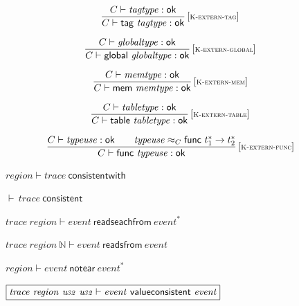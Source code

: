 $$
\begin{array}{@{}c@{}}\displaystyle
\frac{
C \vdash {\mathit{tagtype}} : \mathsf{ok}
}{
C \vdash \mathsf{tag}~{\mathit{tagtype}} : \mathsf{ok}
} \, {[\textsc{\scriptsize K{-}extern{-}tag}]}
\qquad
\end{array}
$$

$$
\begin{array}{@{}c@{}}\displaystyle
\frac{
C \vdash {\mathit{globaltype}} : \mathsf{ok}
}{
C \vdash \mathsf{global}~{\mathit{globaltype}} : \mathsf{ok}
} \, {[\textsc{\scriptsize K{-}extern{-}global}]}
\qquad
\end{array}
$$

$$
\begin{array}{@{}c@{}}\displaystyle
\frac{
C \vdash {\mathit{memtype}} : \mathsf{ok}
}{
C \vdash \mathsf{mem}~{\mathit{memtype}} : \mathsf{ok}
} \, {[\textsc{\scriptsize K{-}extern{-}mem}]}
\qquad
\end{array}
$$

$$
\begin{array}{@{}c@{}}\displaystyle
\frac{
C \vdash {\mathit{tabletype}} : \mathsf{ok}
}{
C \vdash \mathsf{table}~{\mathit{tabletype}} : \mathsf{ok}
} \, {[\textsc{\scriptsize K{-}extern{-}table}]}
\qquad
\end{array}
$$

$$
\begin{array}{@{}c@{}}\displaystyle
\frac{
C \vdash {\mathit{typeuse}} : \mathsf{ok}
 \qquad
{\mathit{typeuse}} \approx_{C} \mathsf{func}~{t_1^\ast} \rightarrow {t_2^\ast}
}{
C \vdash \mathsf{func}~{\mathit{typeuse}} : \mathsf{ok}
} \, {[\textsc{\scriptsize K{-}extern{-}func}]}
\qquad
\end{array}
$$

\vspace{1ex}

$\boxed{{\mathit{region}} \vdash {\mathit{trace}}~\mathsf{consistentwith}}$

$\boxed{{\vdash}\, {\mathit{trace}}~\mathsf{consistent}}$

$\boxed{{\mathit{trace}}~{\mathit{region}} \vdash {\mathit{event}}~\mathsf{readseachfrom}~{{\mathit{event}}^\ast}}$

$\boxed{{\mathit{trace}}~{\mathit{region}}~\mathbb{N} \vdash {\mathit{event}}~\mathsf{readsfrom}~{\mathit{event}}}$

$\boxed{{\mathit{region}} \vdash {\mathit{event}}~\mathsf{notear}~{{\mathit{event}}^\ast}}$

$\boxed{{\mathit{trace}}~{\mathit{region}}~{\mathit{u{\kern-0.1em\scriptstyle 32}}}~{\mathit{u{\kern-0.1em\scriptstyle 32}}} \vdash {\mathit{event}}~\mathsf{valueconsistent}~{\mathit{event}}}$

